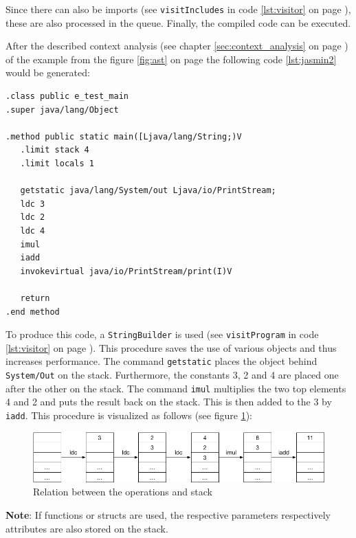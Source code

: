 Since there can also be imports (see \texttt{visitIncludes} in code \ref{lst:visitor} on page \pageref{lst:visitor}), these are also processed in the queue. Finally, the compiled code can be executed.

After the described context analysis (see chapter \ref{sec:context_analysis} on page \pageref{sec:context_analysis}) of the example from the figure \ref{fig:ast} on page \pageref{fig:ast} the following code \ref{lst:jasmin2} would be generated:

\begin{lstlisting}[frame=htrbl, caption={Generated code of {\ttfamily \emph{E}}}, label={lst:jasmin2}, basicstyle=\footnotesize]
.class public e_test_main
.super java/lang/Object

.method public static main([Ljava/lang/String;)V
   .limit stack 4
   .limit locals 1

   getstatic java/lang/System/out Ljava/io/PrintStream;
   ldc 3
   ldc 2
   ldc 4
   imul
   iadd
   invokevirtual java/io/PrintStream/print(I)V

   return
.end method
\end{lstlisting}

To produce this code, a \texttt{StringBuilder} is used (see \texttt{visitProgram} in code \ref{lst:visitor} on page \pageref{lst:visitor}). This procedure saves the use of various objects and thus increases performance. The command \texttt{getstatic} places the object behind \texttt{System/Out} on the stack. Furthermore, the constants 3, 2 and 4 are placed one after the other on the stack. The command \texttt{imul} multiplies the two top elements 4 and 2 and puts the result back on the stack. This is then added to the 3 by \texttt{iadd}. This procedure is visualized as follows (see figure \ref{fig:stack}):

\begin{figure}[bth]
	\centering
	\includegraphics[scale=0.5]{./img/stack}
	\caption[Relation between the operations and stack]{Relation between the operations and stack}
	\label{fig:stack}
\end{figure}
\noindent

\textbf{Note}: If functions or structs are used, the respective parameters respectively attributes are also stored on the stack.

